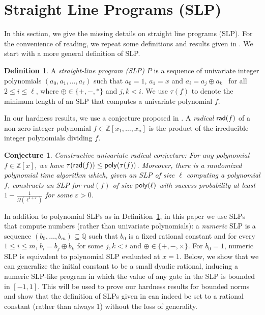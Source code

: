 \documentclass{article}
\theoremstyle{plain}
\newtheorem{conjecture}[theorem]{Conjecture}
\theoremstyle{definition}
\newtheorem{definition}[theorem]{Definition}
\theoremstyle{remark}
\begin{document}
\appendix


\section{Straight Line Programs (SLP)}
\label{sec:SLP}

In this section, we give the missing details on straight line programs (SLP). For the convenience of reading, we repeat some definitions and results given in . We start with a more general definition of SLP.  


\begin{definition}
    \label{def:SLP}
	A {\em straight-line program (SLP)} $P$ is a sequence of univariate integer polynomials $(a_0, a_1, \ldots , a_{\ell})$ such
	that $a_0 = 1$, $a_1 = x$ and $a_i = a_j \oplus a_k$~ for all $2 \leq i \leq \ell$, where $\oplus \in \{+, -, *\}$ and $j, k < i$. We use $\tau(f)$ to denote the minimum length of an SLP that computes a univariate polynomial $f$.
\end{definition}


In our hardness results, we use a conjecture proposed in \cite{10.1145/3510359}. A {\em radical} $\textnormal{\textsf{rad}}(f)$ of a non-zero integer polynomial $f \in \mathbb{Z}[x_1, \ldots , x_n]$ is the product of the irreducible
integer polynomials dividing $f$.

\begin{conjecture}
	\label{con:radical}
	\textnormal{\textsf{Constructive univariate radical conjecture:}} For any polynomial $f \in \mathbb{Z}[x]$, we have
	$\tau(\textnormal{\textsf{rad}}(f)) \leq \textnormal{\textsf{poly}}(\tau(f))$. Moreover, there is a randomized polynomial time algorithm which, given an \textnormal{SLP} of size
	$\ell$ computing a polynomial $f$, constructs an \textnormal{SLP} for $rad(f)$ of size $\textnormal{\textsf{poly}}(\ell)$ with success probability at least $1-\frac{1}{\Omega(\ell^{1+\varepsilon})}$
	for some
	$\varepsilon > 0$.
\end{conjecture}


 
In addition to polynomial SLPs as in Definition~\ref{def:SLP}, in this paper we use SLPs that compute
numbers (rather than univariate polynomials): a \emph{numeric} SLP is a sequence $(b_0,\ldots,b_m) \subseteq\mathbb{Q}$
such that $b_0$ is a fixed rational constant and for every $1\le i\le m$,
$b_i=b_j\oplus b_k$ for some $j,k<i$ and $\oplus\in\{+,-,\times\}$. For $b_0 = 1$, numeric SLP is equivalent to polynomial SLP evaluated at $x = 1$. Below, we show that we can generalize the initial constant to be a small dyadic rational, inducing a numeric SLP-like program  
in which the value of any gate in the SLP is bounded in $[-1,1]$. This will be used to prove our hardness results for bounded norms and show that the definition of SLPs given in  can indeed be set to a rational constant (rather than always $1$) without the loss of generality. 
\end{document}
